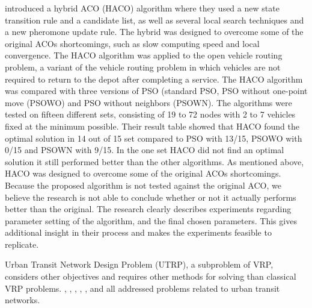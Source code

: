 \citet{sedighpour14} introduced a hybrid ACO (HACO) algorithm where they used a new state transition rule and a candidate list, as well as several local search techniques and a new pheromone update rule. The hybrid was designed to overcome some of the original ACOs shortcomings, such as slow computing speed and local convergence. The HACO algorithm was applied to the open vehicle routing problem, a variant of the vehicle routing problem in which vehicles are not required to return to the depot after completing a service. The HACO algorithm was compared with three versions of PSO (standard PSO, PSO without one-point move (PSOWO) and PSO without neighbors (PSOWN). The algorithms were tested on fifteen different sets, consisting of 19 to 72 nodes with 2 to 7 vehicles fixed at the minimum possible. Their result table showed that HACO found the optimal solution in 14 out of 15 set compared to PSO with 13/15, PSOWO with 0/15 and PSOWN with 9/15. In the one set HACO did not find an optimal solution it still performed better than the other algorithms. As mentioned above, HACO was designed to overcome some of the original ACOs shortcomings. Because the proposed algorithm is not tested against the original ACO, we believe the research is not able to conclude whether or not it actually performs better than the original. The research clearly describes experiments regarding parameter setting of the algorithm, and the final chosen parameters. This gives additional insight in their process and makes the experiments feasible to replicate. \newline

Urban Transit Network Design Problem (UTRP), a subproblem of VRP, considers other objectives and requires other methods for solving than classical VRP problems. \citet{yang07}, \citet{salehinejad10}, \citet{jiang10}, \citet{poorzahedy11}, \citet{nikolic14}, and \citet{kechagiopoulos14} all addressed problems related to urban transit networks. \newline

